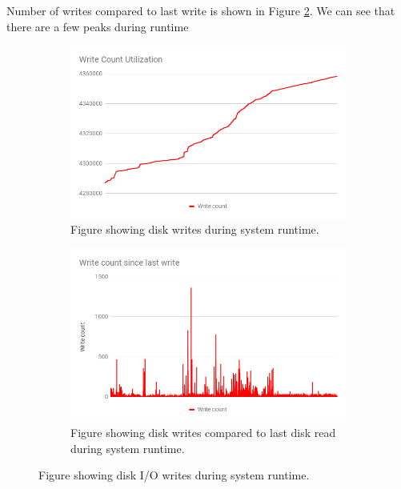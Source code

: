 \documentclass[USenglish]{uit-thesis}
\begin{document}
Number of writes compared to last write is shown in Figure \ref{fig:chart_write_count_since_last}. We can see that there are a few peaks during runtime


\begin{figure}
\centering
\begin{subfigure}[b]{1\textwidth}
   \includegraphics[width=1\textwidth]{chart_write_count.png}
   \caption{Figure showing disk writes during system runtime.}
   \label{fig:chart_write_count} 
\end{subfigure}

\begin{subfigure}[b]{1\textwidth}
   \includegraphics[width=1\textwidth]{chart_write_count_since_last.png}
   \caption{Figure showing disk writes compared to last disk read during system runtime.}
   \label{fig:chart_write_count_since_last}
\end{subfigure}

\caption{Figure showing disk I/O writes during system runtime.}
\label{fig:write_disk}
\end{figure}
\end{document}
